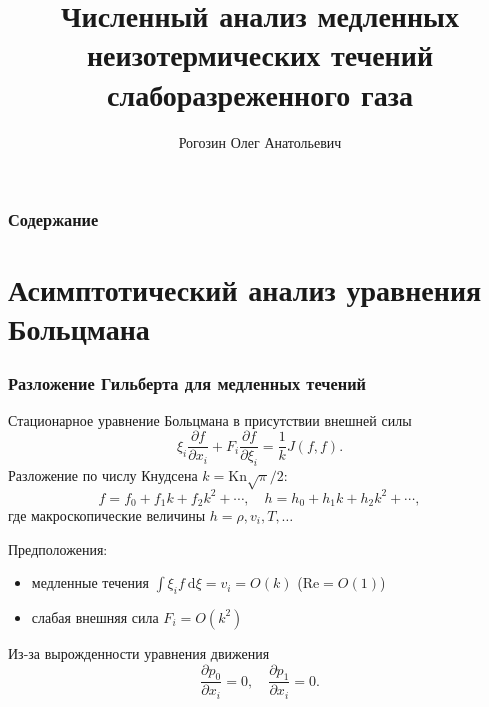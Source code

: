 \documentclass[mathserif]{beamer} %
\title{Численный анализ медленных неизотермических течений слаборазреженного газа}
\author{Рогозин Олег Анатольевич}
\institute{
    Вычислительный центр ФИЦ ИУ РАН
}
\date{}
\newcommand{\Kn}{\mathrm{Kn}}
\newcommand{\dd}{\:\mathrm{d}}
\newcommand{\pder}[2][]{\frac{\partial#1}{\partial#2}}
\newcommand{\dxi}{\dd\xi}
\newcommand{\OO}[1]{O(#1)}
\begin{document}

\begin{frame}
    \frametitle{Содержание}
    \linespread{0.8}
    \tableofcontents
\end{frame}

\section{Асимптотический анализ уравнения Больцмана}

\begin{frame}
    \frametitle{Разложение Гильберта для медленных течений}
    Стационарное уравнение Больцмана в присутствии внешней силы
    \begin{equation}\label{eq:Boltzmann}
        \xi_i\pder[f]{x_i} + F_i\pder[f]{\xi_i} = \frac1k J(f,f).
    \end{equation}
    Разложение по числу Кнудсена \(k=\Kn\sqrt\pi/2\):
    \begin{equation}\label{eq:expansion}
        f = f_0 + f_1k + f_2k^2 + \cdots, \quad h = h_0 + h_1k + h_2k^2 + \cdots,
    \end{equation}
    где макроскопические величины \(h = \rho, v_i, T, \dots\)
    \vspace{5pt}\pause

    Предположения:
    \begin{itemize}
        \item медленные течения \(\int\xi_i f\dxi = v_i = \OO{k}\) (\(\mathrm{Re} = \OO{1}\))
        \item слабая внешняя сила \(F_i = \OO{k^2}\)
    \end{itemize}
    Из-за вырожденности уравнения движения
    \begin{equation}
        \pder[p_0]{x_i} = 0, \quad \pder[p_1]{x_i} = 0.
    \end{equation}
\end{frame}
\end{document}
